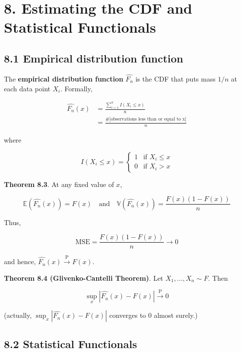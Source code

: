 \section{8. Estimating the CDF and Statistical Functionals}\label{estimating-the-cdf-and-statistical-functionals}

\subsection{8.1 Empirical distribution
function}\label{empirical-distribution-function}

The \textbf{empirical distribution function} \(\hat{F_n}\) is the CDF
that puts mass \(1/n\) at each data point \(X_i\). Formally,

\begin{align}
\hat{F_n}(x) & = \frac{\sum_{i=1}^n I\left(X_i \leq x \right)}{n} \\
&= \frac{\text{#}|\text{observations less than or equal to x}|}{n}
\end{align}

where

\[
\begin{equation}
I\left(X_i \leq x\right) =
    \begin{cases}
      1   & \text{if } X_i \leq x \\
      0   & \text{if } X_i > x
    \end{cases}       
\end{equation}
\]

\textbf{Theorem 8.3}. At any fixed value of \(x\),

\[
\begin{equation}
\mathbb{E}\left( \hat{F_n}(x) \right) = F(x)
\quad\mathrm{and}\quad 
\mathbb{V}\left( \hat{F_n}(x) \right) = \frac{F(x)(1 - F(x))}{n}
\end{equation}
\]

Thus,

\[ \text{MSE} = \frac{F(x)(1 - F(x))}{n} \rightarrow 0 \]

and hence, \(\hat{F_n}(x) \xrightarrow{\text{P}} F(x)\).

\textbf{Theorem 8.4 (Glivenko-Cantelli Theorem)}. Let
\(X_1, \dots, X_n \sim F\). Then

\[ \sup _x |\hat{F_n}(x) - F(x)| \xrightarrow{\text{P}} 0 \]

(actually, \(\sup _x |\hat{F_n}(x) - F(x)|\) converges to 0 almost
surely.)

\subsection{8.2 Statistical
Functionals}\label{statistical-functionals}

